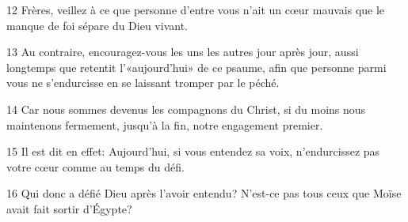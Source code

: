 
12 Frères, veillez à ce que personne d’entre vous n’ait un cœur mauvais que le manque de foi sépare du Dieu vivant.

13 Au contraire, encouragez-vous les uns les autres jour après jour, aussi longtemps que retentit l’«aujourd’hui» de ce psaume, afin que personne parmi vous ne s’endurcisse en se laissant tromper par le péché.

14 Car nous sommes devenus les compagnons du Christ, si du moins nous maintenons fermement, jusqu’à la fin, notre engagement premier.

15 Il est dit en effet: Aujourd’hui, si vous entendez sa voix, n’endurcissez pas votre cœur comme au temps du défi.

16 Qui donc a défié Dieu après l’avoir entendu? N’est-ce pas tous ceux que Moïse avait fait sortir d’Égypte?